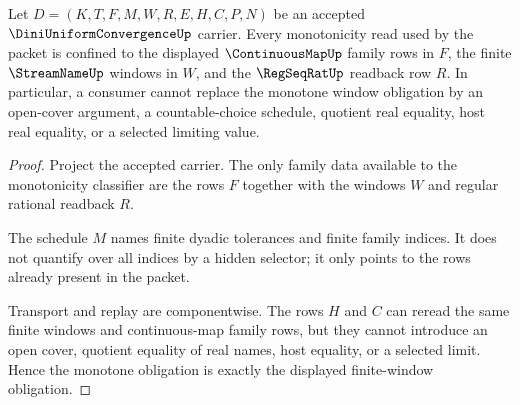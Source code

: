 \begin{theorem}
\label{thm:diniuniformconvergence-obligation-monotone-window}
Let $D=(K,T,F,M,W,R,E,H,C,P,N)$ be an accepted $\DiniUniformConvergenceUp$ carrier. Every monotonicity read used by the packet is confined to the displayed $\ContinuousMapUp$ family rows in $F$, the finite $\StreamNameUp$ windows in $W$, and the $\RegSeqRatUp$ readback row $R$. In particular, a consumer cannot replace the monotone window obligation by an open-cover argument, a countable-choice schedule, quotient real equality, host real equality, or a selected limiting value.
\end{theorem}
\begin{proof}
Project the accepted carrier. The only family data available to the monotonicity classifier are the rows $F$ together with the windows $W$ and regular rational readback $R$.

The schedule $M$ names finite dyadic tolerances and finite family indices. It does not quantify over all indices by a hidden selector; it only points to the rows already present in the packet.

Transport and replay are componentwise. The rows $H$ and $C$ can reread the same finite windows and continuous-map family rows, but they cannot introduce an open cover, quotient equality of real names, host equality, or a selected limit. Hence the monotone obligation is exactly the displayed finite-window obligation.
\end{proof}

